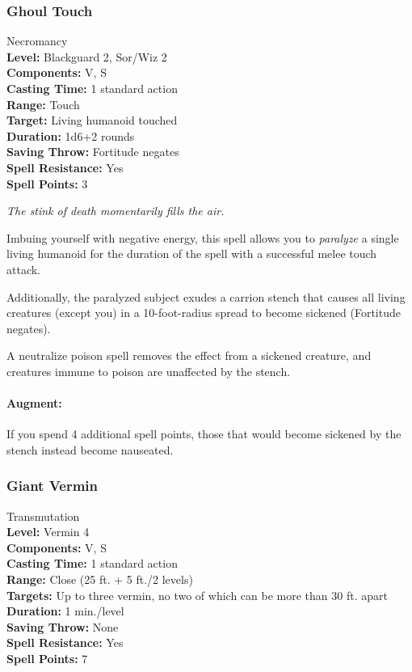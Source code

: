 \subsubsection{Ghoul Touch}
\label{Spell:GhoulTouch}
Necromancy
\\ \textbf{Level:} Blackguard 2, Sor/Wiz 2
\\ \textbf{Components:} V, S
\\ \textbf{Casting Time:} 1 standard action
\\ \textbf{Range:} Touch
\\ \textbf{Target:} Living humanoid touched
\\ \textbf{Duration:} 1d6+2 rounds
\\ \textbf{Saving Throw:} Fortitude negates
\\ \textbf{Spell Resistance:} Yes
\\ \textbf{Spell Points:} 3

\emph{The stink of death momentarily fills the air.}

Imbuing yourself with negative energy, 
this spell allows you to \emph{paralyze} a single living humanoid for the duration of the spell 
with a successful melee touch attack.

Additionally, the paralyzed subject exudes a carrion stench that causes all living creatures (except you) 
in a 10-foot-radius spread to become sickened (Fortitude negates). 

A neutralize poison spell removes the effect from a sickened creature, and creatures immune to poison are unaffected by the stench.

\paragraph{Augment:} If you spend 4 additional spell points, those that would become sickened by the stench instead become nauseated.

\subsubsection{Giant Vermin}
\label{Spell:GiantVermin}
Transmutation
\\ \textbf{Level:} Vermin 4
\\ \textbf{Components:} V, S
\\ \textbf{Casting Time:} 1 standard action
\\ \textbf{Range:} Close (25 ft. + 5 ft./2 levels)
\\ \textbf{Targets:} Up to three vermin, no two of which can be more than 30 ft. apart
\\ \textbf{Duration:} 1 min./level
\\ \textbf{Saving Throw:} None
\\ \textbf{Spell Resistance:} Yes
\\ \textbf{Spell Points:} 7

